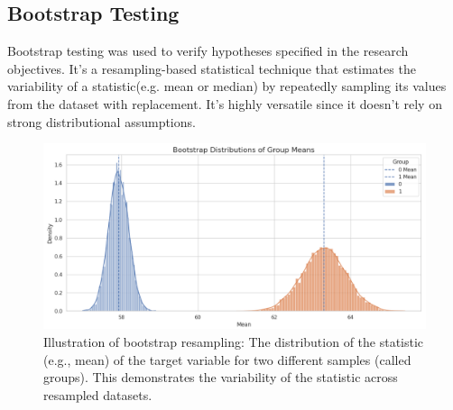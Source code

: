 \subsection{Bootstrap Testing}

Bootstrap testing was used to verify hypotheses specified in the research
objectives. It's a resampling-based statistical technique that estimates the
variability of a statistic(e.g. mean or median)  by
repeatedly sampling its values from the dataset with replacement. It's highly
versatile since it doesn't rely on strong distributional assumptions.


\begin{center}
\begin{figure}[ht]
  \centering
  \includegraphics[width=5in]{img/bootstrap.jpg}
  \caption{Illustration of bootstrap resampling: The distribution of the
  statistic (e.g., mean) of the target variable for two different samples
(called groups). This demonstrates the variability of the statistic across
resampled datasets.}
  \label{Figure:fig_beh}
\end{figure}
\end{center}
